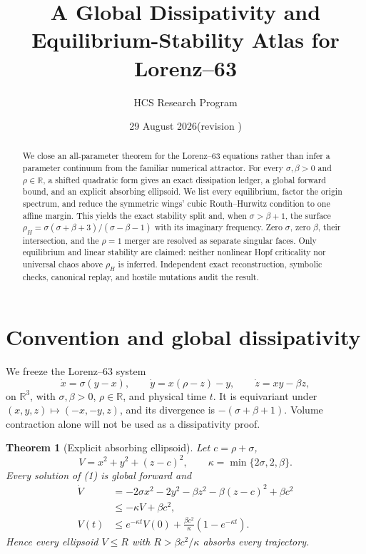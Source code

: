 \documentclass[11pt]{article}
\title{A Global Dissipativity and Equilibrium-Stability Atlas for Lorenz--63}
\author{HCS Research Program}
\date{29 August 2026\quad (revision \CRevisionRound)}
\newtheorem{theorem}{Theorem}
\newcommand{\RR}{\mathbb R}
\begin{document}
\maketitle

\begin{abstract}
We close an all-parameter theorem for the Lorenz--63 equations rather than
infer a parameter continuum from the familiar numerical attractor.  For every
$\sigma,\beta>0$ and $\rho\in\RR$, a shifted quadratic form gives an exact
dissipation ledger, a global forward bound, and an explicit absorbing
ellipsoid.  We list every equilibrium, factor the origin spectrum, and reduce
the symmetric wings' cubic Routh--Hurwitz condition to one affine margin.
This yields the exact stability split and, when $\sigma>\beta+1$, the surface
$\rho_H=\sigma(\sigma+\beta+3)/(\sigma-\beta-1)$ with its imaginary frequency.
Zero $\sigma$, zero $\beta$, their intersection, and the $\rho=1$ merger are
resolved as separate singular faces.  Only equilibrium and linear stability
are claimed: neither nonlinear Hopf criticality nor universal chaos above
$\rho_H$ is inferred.  Independent exact reconstruction, symbolic checks,
canonical replay, and hostile mutations audit the result.
\end{abstract}

\section{Convention and global dissipativity}
We freeze the Lorenz--63 system
\begin{equation}
 \dot x=\sigma(y-x),\qquad
 \dot y=x(\rho-z)-y,\qquad
 \dot z=xy-\beta z,                                  \tag{1}
\end{equation}
on $\RR^3$, with $\sigma,\beta>0$, $\rho\in\RR$, and physical time $t$.
It is equivariant under $(x,y,z)\mapsto(-x,-y,z)$, and its divergence is
$-(\sigma+\beta+1)$.  Volume contraction alone will not be used as a
dissipativity proof.

\begin{theorem}[Explicit absorbing ellipsoid]\label{thm:absorb}
Let $c=\rho+\sigma$,
\[
 V=x^2+y^2+(z-c)^2,\qquad
 \kappa=\min\{2\sigma,2,\beta\}.
\]
Every solution of (1) is global forward and
\begin{align}
 \dot V
 &=-2\sigma x^2-2y^2-\beta z^2-\beta(z-c)^2+\beta c^2
                                                        \tag{2}\\
 &\le -\kappa V+\beta c^2,                              \tag{3}\\
 V(t)&\le e^{-\kappa t}V(0)+\frac{\beta c^2}{\kappa}
                    (1-e^{-\kappa t}).                  \tag{4}
\end{align}
Hence every ellipsoid $V\le R$ with $R>\beta c^2/\kappa$ absorbs every
trajectory.
\end{theorem}
\end{document}
